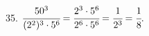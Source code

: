 35. $\cfrac{50^3}{(2^2)^3\cdot5^6}=\cfrac{2^3\cdot5^6}{2^6\cdot5^6}=\cfrac{1}{2^3}=\cfrac{1}{8}.$\\
